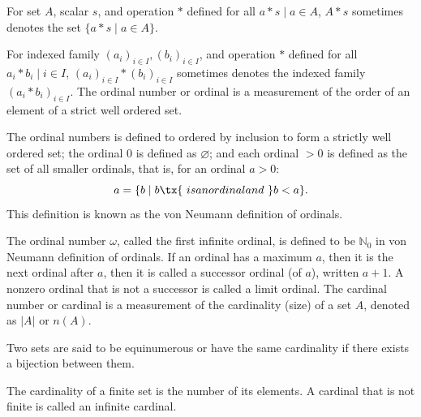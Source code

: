 \documentclass[a4paper,12pt]{article}
\begin{document}
For set $A$, scalar $s$, and operation $*$ defined for all $a*s\mid a\in A$, $A*s$ sometimes denotes the set $\{a*s\mid a\in A\}$.

For indexed family $(a_i)_{i\in I},(b_i)_{i\in I}$, and operation $*$ defined for all $a_i*b_i\mid i\in I$, $(a_i)_{i\in I}*(b_i)_{i\in I}$ sometimes denotes the indexed family $(a_i*b_i)_{i\in I}$.
The ordinal number or ordinal is a measurement of the order of an element of a strict well ordered set.

The ordinal numbers is defined to ordered by inclusion to form a strictly well ordered set; the ordinal $0$ is defined as $\varnothing$; and each ordinal $>0$ is defined as the set of all smaller ordinals, that is, for an ordinal $a>0$:
\[a=\{b\mid b\tx{\ is an ordinal and\ }b<a\}.\]
This definition is known as the von Neumann definition of ordinals.

The ordinal number $\omega$, called the first infinite ordinal, is defined to be $\mathbb{N}_0$ in von Neumann definition of ordinals.
If an ordinal has a maximum $a$, then it is the next ordinal after $a$, then it is called a successor ordinal (of $a$), written $a+1$.
A nonzero ordinal that is not a successor is called a limit ordinal.
The cardinal number or cardinal is a measurement of the cardinality (size) of a set $A$, denoted as $|A|$ or $n(A)$.

Two sets are said to be equinumerous or have the same cardinality if there exists a bijection between them.

The cardinality of a finite set is the number of its elements. A cardinal that is not finite is called an infinite cardinal.
\end{document}

